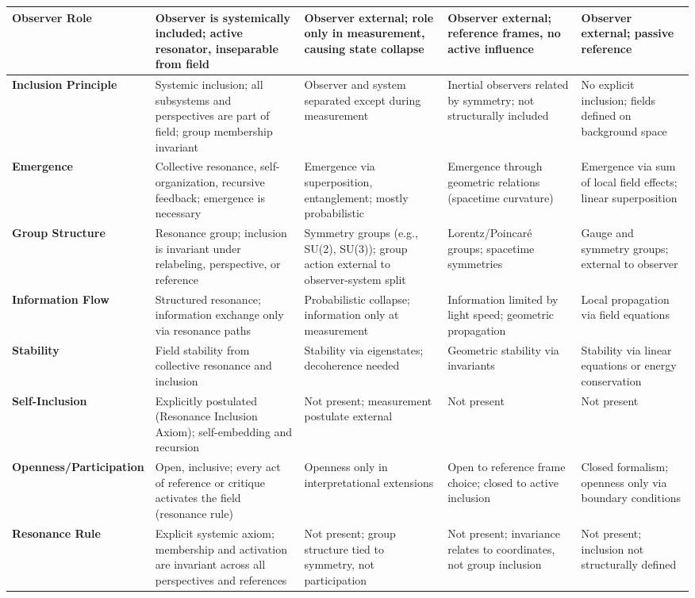 \documentclass[12pt]{iopart}
\begin{document}
\begin{center}
\begin{longtable}{|p{4cm}|p{3cm}|p{3cm}|p{3cm}|p{3cm}|}
		\textbf{Observer Role} & Observer is systemically included; active resonator, inseparable from field & Observer external; role only in measurement, causing state collapse & Observer external; reference frames, no active influence & Observer external; passive reference \\
		\hline
		\textbf{Inclusion Principle} & Systemic inclusion; all subsystems and perspectives are part of field; group membership invariant & Observer and system separated except during measurement & Inertial observers related by symmetry; not structurally included & No explicit inclusion; fields defined on background space \\
		\hline
		\textbf{Emergence} & Collective resonance, self-organization, recursive feedback; emergence is necessary & Emergence via superposition, entanglement; mostly probabilistic & Emergence through geometric relations (spacetime curvature) & Emergence via sum of local field effects; linear superposition \\
		\hline
		\textbf{Group Structure} & Resonance group; inclusion is invariant under relabeling, perspective, or reference & Symmetry groups (e.g., SU(2), SU(3)); group action external to observer-system split & Lorentz/Poincaré groups; spacetime symmetries & Gauge and symmetry groups; external to observer \\
		\hline
		\textbf{Information Flow} & Structured resonance; information exchange only via resonance paths & Probabilistic collapse; information only at measurement & Information limited by light speed; geometric propagation & Local propagation via field equations \\
		\hline
		\textbf{Stability} & Field stability from collective resonance and inclusion & Stability via eigenstates; decoherence needed & Geometric stability via invariants & Stability via linear equations or energy conservation \\
		\hline
		\textbf{Self-Inclusion} & Explicitly postulated (Resonance Inclusion Axiom); self-embedding and recursion & Not present; measurement postulate external & Not present & Not present \\
		\hline
		\textbf{Openness/Participation} & Open, inclusive; every act of reference or critique activates the field (resonance rule) & Openness only in interpretational extensions & Open to reference frame choice; closed to active inclusion & Closed formalism; openness only via boundary conditions \\
		\hline
		\textbf{Resonance Rule} & Explicit systemic axiom; membership and activation are invariant across all perspectives and references & Not present; group structure tied to symmetry, not participation & Not present; invariance relates to coordinates, not group inclusion & Not present; inclusion not structurally defined \\

\end{longtable}
\end{center}
\end{document}
